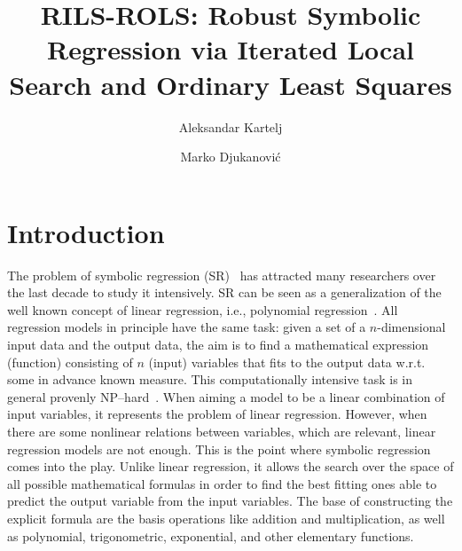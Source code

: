 \documentclass[a4paper,12pt]{elsarticle}
\begin{document}
	
	
	\title{RILS-ROLS: Robust Symbolic Regression via Iterated Local Search and Ordinary Least Squares}
	
\author[1]{Aleksandar Kartelj}
\author[2]{Marko Djukanovi\'c}
	\address[1]{$kartelj@matf.bg.ac.rs$, \\  Faculty of Mathematics, University of Belgrade, Serbia}
    \address[2]{$ marko.djukanovic@pmf.unibl.org$,\\   Faculty of Natural Sciences and Mathematics, University of Banja Luka, Bosnia and Herzegovina}
	\begin{abstract}
	\end{abstract}
	\maketitle
	
	
\section{Introduction}\label{sec:introduction}
	
	The problem of symbolic regression (SR)~\cite{billard2002symbolic} has attracted many researchers over the last decade to study it intensively. SR can be seen as a generalization of the well known  concept of linear regression, i.e., polynomial regression~\cite{stimson1978interpreting}. All regression models in principle have the same task: given a set of a $n$-dimensional input data and the output data, the aim is to find a  mathematical expression (function) consisting of $n$ (input) variables that fits to the output data w.r.t. some in advance known measure.  This computationally intensive task is in general  provenly NP--hard~\cite{virgolin2022symbolic}. When aiming a model to be a linear combination of input variables, it represents the problem of linear regression. However, when there are some nonlinear relations between variables, which are relevant, linear regression models are not enough. This is the point where symbolic regression comes into the play. Unlike linear regression, it allows the search over the space of all possible mathematical formulas in order to find the best fitting ones able to  predict the output variable from the input variables. The base of constructing the explicit formula are the basis operations like addition and multiplication, as well as polynomial, trigonometric, exponential, and other elementary functions.  
	
\end{document}

